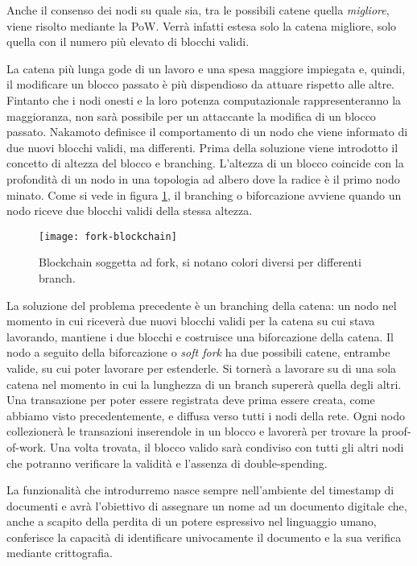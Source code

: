 	Anche il consenso dei nodi su quale sia, tra le possibili catene quella \textit{migliore}, viene risolto mediante la PoW. Verrà infatti estesa solo la catena migliore, solo quella con il numero più elevato di blocchi validi.
	
	La catena più lunga gode di un lavoro e una spesa maggiore impiegata e, quindi, il modificare un blocco passato è più dispendioso da attuare rispetto alle altre. 
	Fintanto che i nodi onesti e la loro potenza computazionale rappresenteranno la maggioranza, non sarà possibile per un attaccante la modifica di un blocco passato. 
	Nakamoto definisce il comportamento di un nodo che viene informato di due nuovi blocchi validi, ma differenti.
	Prima della soluzione viene introdotto il concetto di altezza del blocco e branching. 
	L'altezza di un blocco coincide con la profondità di un nodo in una topologia ad albero dove la radice è il primo nodo minato. 
	Come si vede in figura \ref{fig:fork-blockchain}, il branching o biforcazione avviene quando un nodo riceve due blocchi validi della stessa altezza. 
	
		\begin{figure}
			\caption{Blockchain soggetta ad fork, si notano colori diversi per differenti branch.}
			\centering
			\texttt{[image: fork-blockchain]}
			\label{fig:fork-blockchain}
		\end{figure}
	
	
	La soluzione del problema precedente è un branching della catena: un nodo nel momento in cui riceverà due nuovi blocchi validi per la catena su cui stava lavorando, mantiene i due blocchi e costruisce una biforcazione della catena. Il nodo a seguito della biforcazione o \textit{soft fork} ha due possibili catene, entrambe valide, su cui poter lavorare per estenderle. Si tornerà a lavorare su di una sola catena nel momento in cui la lunghezza di un branch supererà quella degli altri.
	Una transazione per poter essere registrata deve prima essere creata, come abbiamo visto precedentemente, e diffusa verso tutti i nodi della rete. Ogni nodo collezionerà le transazioni inserendole in un blocco e lavorerà per trovare la proof-of-work. Una volta trovata, il blocco valido sarà condiviso con tutti gli altri nodi che potranno verificare la validità e l'assenza di double-spending.
	
	La funzionalità che introdurremo nasce sempre nell'ambiente del timestamp di documenti e avrà l'obiettivo di assegnare un nome ad un documento digitale che, anche a scapito della perdita di un potere espressivo nel linguaggio umano, conferisce la capacità di identificare univocamente il documento e la sua verifica mediante crittografia\cite{massias1999design}.
	

